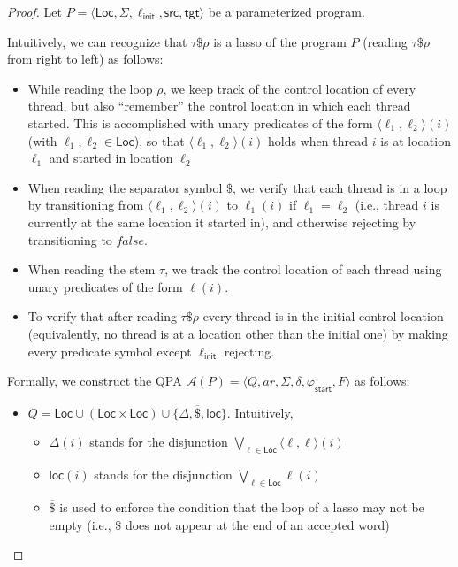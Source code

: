 \documentclass[9pt,nocopyrightspace]{sigplanconf}
\theoremstyle{definition}
\newcommand{\tuple}[1]{\langle #1 \rangle}
\newcommand{\false}{\textit{false}}
\newcommand{\Loc}{\textsf{Loc}}
\newcommand{\src}{\textsf{src}}
\newcommand{\tgt}{\textsf{tgt}}
\newcommand{\init}{\textsf{init}}
\newcommand{\loc}{\mathsf{loc}}
\newcommand{\start}{\mathsf{start}}
\renewcommand{\phi}{\varphi}
\newcommand{\ar}{\textit{ar}}
\begin{document}
\proppaprogram*
\begin{proof}
  Let $P = \tuple{\Loc,\Sigma,\ell_\init,\src,\tgt}$ be a parameterized
  program.

  Intuitively, we can recognize that $\tau\$\rho$ is a lasso of the program
  $P$ (reading $\tau\$\rho$ from right to left) as follows:
  \begin{itemize}
  \item While reading the loop $\rho$, we keep track of the control location
    of every thread, but also ``remember'' the control location in which each
    thread started.  This is accomplished with unary predicates of the form
    $\tuple{\ell_1,\ell_2}(i)$ (with $\ell_1,\ell_2 \in \Loc$), so that
    $\tuple{\ell_1,\ell_2}(i)$ holds when thread $i$ is at location $\ell_1$
    and started in location $\ell_2$
  \item When reading the separator symbol $\$$, we verify that each thread is
    in a loop by transitioning from $\tuple{\ell_1,\ell_2}(i)$ to $\ell_1(i)$
    if $\ell_1 = \ell_2$ (i.e., thread $i$ is currently at the same location
    it started in), and otherwise rejecting by transitioning to $\false$.
  \item When reading the stem $\tau$, we track the control location of each
    thread using unary predicates of the form $\ell(i)$.
  \item To verify that after reading $\tau\$\rho$ every thread is in the
    initial control location (equivalently, no thread is at a location other
    than the initial one) by making every predicate symbol except $\ell_\init$
    rejecting.
  \end{itemize}

  Formally, we construct the QPA $\mathcal{A}(P) =
  \tuple{Q,\ar,\Sigma,\delta,\phi_\start,F}$ as follows:
  \begin{itemize}
  \item $Q = \Loc \cup (\Loc \times \Loc) \cup \{ \Delta, \overline{\$}, \loc \}$.  Intuitively,
    \begin{itemize}
    \item $\Delta(i)$ stands for the disjunction $\bigvee_{\ell \in
      \Loc} \tuple{\ell,\ell}(i)$
    \item $\loc(i)$ stands for the disjunction $\bigvee_{\ell\in \Loc} \ell(i)$
    \item $\overline{\$}$ is used to enforce the condition that the loop of a
      lasso may not be empty (i.e., $\$$ does not appear at the end of an
      accepted word)
    \end{itemize}
      

\end{itemize}
\end{proof}
\end{document}

